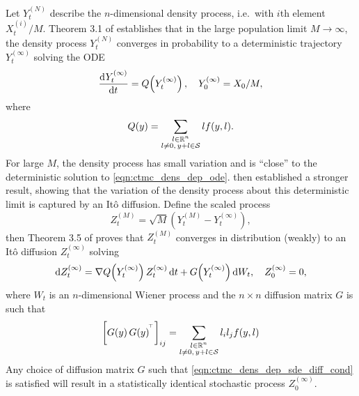 Let \(Y_t^{(N)}\) describe the \(n\)-dimensional density process, i.e.\ with \(i\)th element \(X_t^{(i)} / M\).
Theorem 3.1 of \citet{Kurtz_1970_SolutionsOrdinaryDifferential} establishes that in the large population limit \(M \to \infty\), the density process \(Y_t^{(N)}\) converges in probability to a deterministic trajectory \(Y_t^{(\infty)}\) solving the ODE
\begin{equation}
	\dod{Y_t^{(\infty)}}{t} = Q\!\left(Y_t^{(\infty)}\right), \quad Y_0^{(\infty)} = X_0 / M,
	\label{eqn:ctmc_dens_dep_ode}
\end{equation}
where
\[
	Q\!\left(y\right) = \sum_{\substack{l \in \mathbb{R}^n \\ l \neq 0,\, y + l \in \mathcal{S}}}{l f\!\left(y, l\right)}.
\]
For large \(M\), the density process has small variation and is ``close'' to the deterministic solution to \cref{eqn:ctmc_dens_dep_ode}.
\citet{Kurtz_1971_LimitTheoremsSequences} then established a stronger result, showing that the variation of the density process about this deterministic limit is captured by an It\^o diffusion.
Define the scaled process
\[
	Z_t^{(M)} = \sqrt{M}\left(Y_t^{(M)} - Y_{t}^{(\infty)}\right),
\]
then Theorem 3.5 of \citet{Kurtz_1971_LimitTheoremsSequences} proves that \(Z_t^{(M)}\) converges in distribution (weakly) to an It\^o diffusion \(Z_t^{(\infty)}\) solving
\begin{equation}
	\dif Z_t^{(\infty)} = \nabla Q\!\left(Y_t^{(\infty)}\right) Z_t^{(\infty)}\dif t + G\!\left(Y_t^{(\infty)}\right)\dif W_t, \quad Z_0^{(\infty)} = 0,
	\label{eqn:ctmc_dens_dep_sde}
\end{equation}
where \(W_t\) is an \(n\)-dimensional Wiener process and the \(n \times n\) diffusion matrix \(G\) is such that
\begin{equation}
	\left[G\!\left(y\right)G\!\left(y\right)^{^{\!\top}}\right]_{ij} = \sum_{\substack{l \in \mathbb{R}^n \\ l \neq 0,\, y + l \in \mathcal{S}}}{l_i l_j f\!\left(y,l\right)}
	\label{eqn:ctmc_dens_dep_sde_diff_cond}
\end{equation}
Any choice of diffusion matrix \(G\) such that \cref{eqn:ctmc_dens_dep_sde_diff_cond} is satisfied will result in a statistically identical stochastic process \(Z_0^{(\infty)}\).


